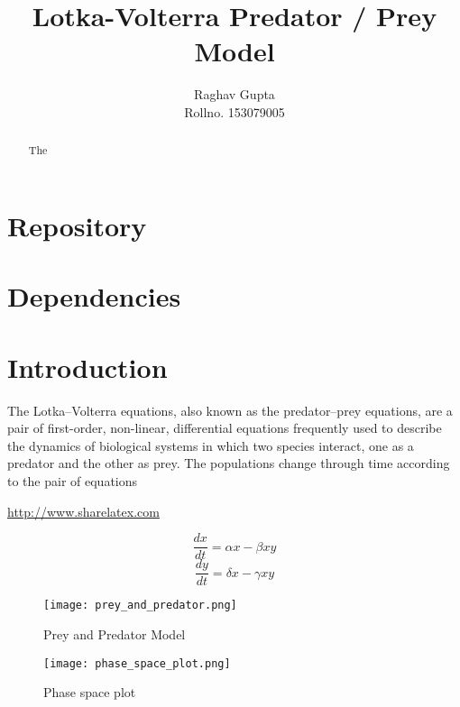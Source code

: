 \documentclass{article}
\title{Lotka-Volterra Predator / Prey Model}
\author{Raghav Gupta \\
		Rollno. 153079005}
\begin{document}
\maketitle
\newpage
\tableofcontents
\newpage
\listoffigures
\newpage

\begin{abstract}
The
\end{abstract}

\newpage
\section{Repository}
\section{Dependencies}
\section{Introduction}
The Lotka–Volterra equations, also known as the predator–prey equations, are a pair of first-order, non-linear, differential equations frequently used to describe the dynamics of biological systems in which two species interact, one as a predator and the other as prey. The populations change through time according to the pair of equations\cite{greenwade93}

\url{http://www.sharelatex.com}

\begin{equation*}
\dfrac{dx}{dt} = \alpha x - \beta xy
\end{equation*}
\begin{equation*}
\dfrac{dy}{dt} = \delta x - \gamma xy
\end{equation*}

\begin{figure}[h]
\begin{center}
\texttt{[image: prey\_and\_predator.png]}
\caption{Prey and Predator Model}
\end{center}
\end{figure}

\begin{figure}[h]
\begin{center}
\texttt{[image: phase\_space\_plot.png]}
\caption{Phase space plot}
\end{center}
\end{figure}

\newpage


\end{document}
